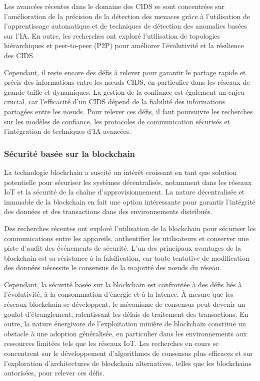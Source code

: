 Les avancées récentes dans le domaine des CIDS se sont concentrées sur l'amélioration de la précision de la détection des menaces grâce à l'utilisation de l'apprentissage automatique et de techniques de détection des anomalies basées sur l'IA. En outre, les recherches ont exploré l'utilisation de topologies hiérarchiques et peer-to-peer (P2P) pour améliorer l'évolutivité et la résilience des CIDS.

Cependant, il reste encore des défis à relever pour garantir le partage rapide et précis des informations entre les nœuds CIDS, en particulier dans les réseaux de grande taille et dynamiques. La gestion de la confiance est également un enjeu crucial, car l'efficacité d'un CIDS dépend de la fiabilité des informations partagées entre les nœuds. Pour relever ces défis, il faut poursuivre les recherches sur les modèles de confiance, les protocoles de communication sécurisés et l'intégration de techniques d'IA avancées.

\subsubsection{Sécurité basée sur la blockchain}

La technologie blockchain a suscité un intérêt croissant en tant que solution potentielle pour sécuriser les systèmes décentralisés, notamment dans les réseaux IoT et la sécurité de la chaîne d'approvisionnement. La nature décentralisée et immuable de la blockchain en fait une option intéressante pour garantir l'intégrité des données et des transactions dans des environnements distribués.

Des recherches récentes ont exploré l'utilisation de la blockchain pour sécuriser les communications entre les appareils, authentifier les utilisateurs et conserver une piste d'audit des événements de sécurité. L'un des principaux avantages de la blockchain est sa résistance à la falsification, car toute tentative de modification des données nécessite le consensus de la majorité des nœuds du réseau.

Cependant, la sécurité basée sur la blockchain est confrontée à des défis liés à l'évolutivité, à la consommation d'énergie et à la latence. À mesure que les réseaux blockchain se développent, le mécanisme de consensus peut devenir un goulot d'étranglement, ralentissant les délais de traitement des transactions. En outre, la nature énergivore de l'exploitation minière de blockchain constitue un obstacle à une adoption généralisée, en particulier dans les environnements aux ressources limitées tels que les réseaux IoT. Les recherches en cours se concentrent sur le développement d'algorithmes de consensus plus efficaces et sur l'exploration d'architectures de blockchain alternatives, telles que les blockchains autorisées, pour relever ces défis.

